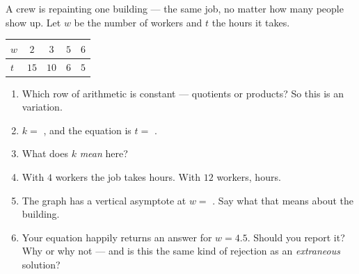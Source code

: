 \documentclass[10pt]{article}
\begin{document}
\begin{practicebox}
A crew is repainting one building --- the same job, no matter how many people show up. Let $w$ be the
number of workers and $t$ the hours it takes.
\begin{center}
\renewcommand{\arraystretch}{1.3}
\begin{tabular}{|l|c|c|c|c|}
\hline
\rowcolor{forestbg}
$w$ & $2$ & $3$ & $5$ & $6$ \\ \hline
$t$ & $15$ & $10$ & $6$ & $5$ \\ \hline
\end{tabular}
\end{center}
\begin{enumerate}[leftmargin=1.7em, itemsep=6pt]
  \item Which row of arithmetic is constant --- quotients or products?  \; So this is an
         variation.
  \item $k=$ , and the equation is $t=$ .
  \item What does $k$ \emph{mean} here? 
  \item With $4$ workers the job takes  hours. With $12$ workers,  hours.
  \item The graph has a vertical asymptote at $w=$ . Say what that means about the
        building. 
  \item Your equation happily returns an answer for $w=4.5$. Should you report it? Why or why not ---
        and is this the same kind of rejection as an \emph{extraneous} solution? 
\end{enumerate}
\end{practicebox}
\end{document}
